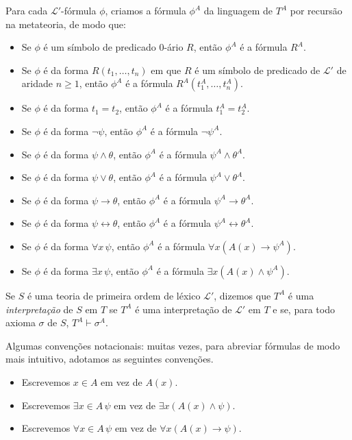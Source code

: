 \begin{metadefinition}
    Para cada $\mathcal L'$-fórmula $\phi$, criamos a fórmula $\phi^A$ da linguagem de $T^A$ por recursão na metateoria, de modo que:
    \begin{itemize}
        \item Se $\phi$ é um símbolo de predicado $0$-ário $R$, então $\phi^A$ é a fórmula $R^A$.
        \item Se $\phi$ é da forma $R(t_1, \dots, t_n)$ em que $R$ é um símbolo de predicado de $\mathcal L'$ de aridade $n\geq 1$, então $\phi^A$ é a fórmula $R^A(t_1^A, \dots, t_n^A)$.
        \item Se $\phi$ é da forma $t_1=t_2$, então $\phi^A$ é a fórmula $t_1^A=t_2^A$.
        \item Se $\phi$ é da forma $\neg \psi$, então $\phi^A$ é a fórmula $\neg \psi^A$.
        \item Se $\phi$ é da forma $\psi\wedge \theta$, então $\phi^A$ é a fórmula $\psi^A\wedge \theta^A$.
        \item Se $\phi$ é da forma $\psi\vee \theta$, então $\phi^A$ é a fórmula $\psi^A\vee \theta^A$.
        \item Se $\phi$ é da forma $\psi\to \theta$, então $\phi^A$ é a fórmula $\psi^A\to \theta^A$.
        \item Se $\phi$ é da forma $\psi\leftrightarrow \theta$, então $\phi^A$ é a fórmula $\psi^A\leftrightarrow \theta^A$.
        \item Se $\phi$ é da forma $\forall x\,\psi$, então $\phi^A$ é a fórmula $\forall x (A(x)\to \psi^A)$.
        \item Se $\phi$ é da forma $\exists x\,\psi$, então $\phi^A$ é a fórmula $\exists x (A(x)\wedge \psi^A)$.
    \end{itemize}

    Se $S$ é uma teoria de primeira ordem de léxico $\mathcal L'$, dizemos que $T^A$ é uma \emph{interpretação} de $S$ em $T$ se $T^A$ é uma interpretação de $\mathcal L'$ em $T$ e se, para todo axioma $\sigma$ de $S$, $T^A\vdash \sigma^A$.

    Algumas convenções notacionais: muitas vezes, para abreviar fórmulas de modo mais intuitivo, adotamos as seguintes convenções.

    \begin{itemize}
        \item Escrevemos $x\in A$ em vez de $A(x)$.
        \item Escrevemos $\exists x\in A\,\psi$ em vez de $\exists x (A(x)\wedge \psi)$.
        \item Escrevemos $\forall x\in A\,\psi$ em vez de $\forall x (A(x)\to \psi)$.
    \end{itemize}
\end{metadefinition}


